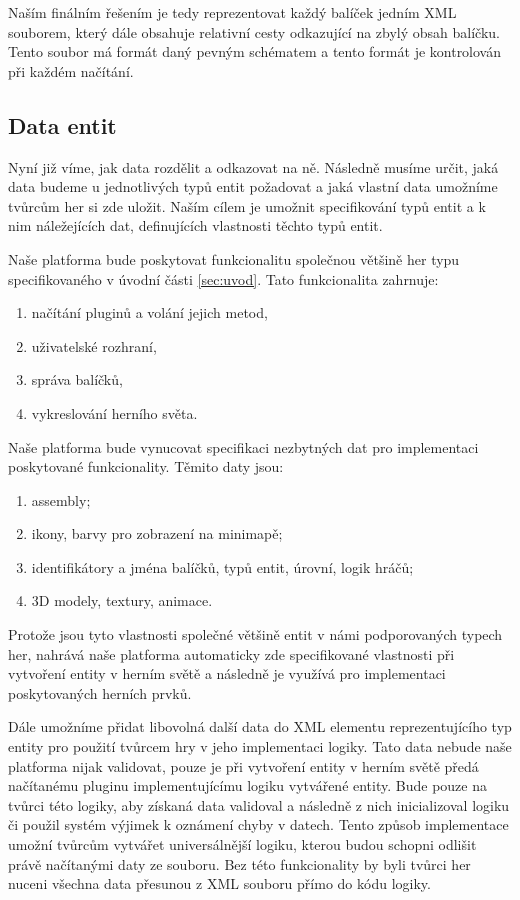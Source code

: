 Naším finálním řešením je tedy reprezentovat každý balíček jedním XML souborem, který dále obsahuje relativní cesty odkazující na zbylý obsah balíčku. Tento soubor má formát daný pevným schématem a tento formát je kontrolován při každém načítání. 

\subsection{Data entit}
Nyní již víme, jak data rozdělit a odkazovat na ně. Následně musíme určit, jaká data budeme u jednotlivých typů entit požadovat a jaká vlastní data umožníme tvůrcům her si zde uložit. Naším cílem je umožnit specifikování typů entit a k nim náležejících dat, definujících vlastnosti těchto typů entit. 

Naše platforma bude poskytovat funkcionalitu společnou většině her typu specifikovaného v úvodní části \ref{sec:uvod}. 
Tato funkcionalita zahrnuje:
\begin{enumerate}
	\item načítání pluginů a volání jejich metod,
	\item uživatelské rozhraní,
	\item správa balíčků,
	\item vykreslování herního světa.
\end{enumerate} 

Naše platforma bude vynucovat specifikaci nezbytných dat pro implementaci poskytované funkcionality. Těmito daty jsou:
\begin{enumerate}
	\item assembly;
	\item ikony, barvy pro zobrazení na minimapě;
	\item identifikátory a jména balíčků, typů entit, úrovní, logik hráčů;
	\item 3D modely, textury, animace.
\end{enumerate}
Protože jsou tyto vlastnosti společné většině entit v námi podporovaných typech her, nahrává naše platforma automaticky zde specifikované vlastnosti při vytvoření entity v herním světě a následně je využívá pro implementaci poskytovaných herních prvků.

Dále umožníme přidat libovolná další data do XML elementu reprezentujícího typ entity pro použití tvůrcem hry v jeho implementaci logiky. Tato data nebude naše platforma nijak validovat, pouze je při vytvoření entity v herním světě předá načítanému pluginu implementujícímu logiku vytvářené entity. Bude pouze na tvůrci této logiky, aby získaná data validoval a následně z nich inicializoval logiku či použil systém výjimek k oznámení chyby v datech. Tento způsob implementace umožní tvůrcům vytvářet universálnější logiku, kterou budou schopni odlišit právě načítanými daty ze souboru. Bez této funkcionality by byli tvůrci her nuceni všechna data přesunou z XML souboru přímo do kódu logiky.

